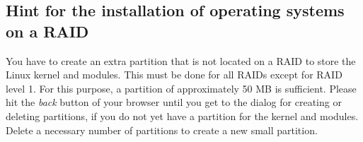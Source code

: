 \subsection{Hint for the installation of operating systems on a RAID}
You have to create an extra partition that is not located on a RAID to store the Linux kernel and modules. This must be done for all RAIDs except for RAID level 1. For this purpose, a partition of approximately 50 MB is sufficient. Please hit the \textit{back} button of your browser until you get to the dialog for creating or deleting partitions, if you do not yet have a partition for the kernel and modules. Delete a necessary number of partitions to create a new small partition.\\
